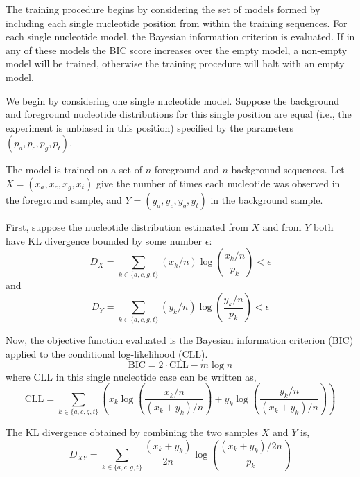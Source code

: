 \documentclass[letterpaper]{article}
\begin{document}
The training procedure begins by considering the set of models formed by
including each single nucleotide position from within the training sequences.
For each single nucleotide model, the Bayesian information criterion is
evaluated. If in any of these models the BIC score increases over the empty
model, a non-empty model will be trained, otherwise the training procedure will
halt with an empty model.

We begin by considering one single nucleotide model. Suppose the background and
foreground nucleotide distributions for this single position are equal (i.e.,
the experiment is unbiased in this position) specified by the parameters $(p_{a}, p_{c},
p_{g}, p_{t})$.

The model is trained on a set of $n$ foreground and $n$ background sequences.
Let $X = (x_{a}, x_{c}, x_{g}, x_{t})$ give the number of times each nucleotide
was observed in the foreground sample, and $Y = (y_{a}, y_{c}, y_{g}, y_{t})$
in the background sample.

First, suppose the nucleotide distribution estimated from $X$ and from $Y$ both
have KL divergence bounded by some number $\epsilon$:
$$ D_{X} = \sum_{k \in \{a, c, g, t\}} (x_k / n) \log \left( \frac{x_k / n}{p_k}
\right) < \epsilon $$
and
$$ D_{Y} = \sum_{k \in \{a, c, g, t\}} (y_k / n) \log \left( \frac{y_k / n}{p_k}
\right) < \epsilon $$

Now, the objective function evaluated is the Bayesian information criterion (BIC)
applied to the conditional log-likelihood (CLL).
$$ \text{BIC} = 2 \cdot \text{CLL} - m \log n $$
where CLL in this single nucleotide case can be written as,
$$ \text{CLL} =
\sum_{k \in \{a, c, g, t\}}
\left(
x_k \log \left( \frac{x_k/n}{(x_k + y_k)/n} \right) +
y_k \log \left( \frac{y_k/n}{(x_k + y_k)/n} \right) \right)$$

The KL divergence obtained by combining the two samples $X$ and $Y$ is,
$$D_{XY} = \sum_{k \in \{a, c, g, t\}}
\frac{(x_k + y_k)}{2n}
\log \left( \frac{(x_k + y_k)/2n}{p_k} \right)$$
\end{document}
